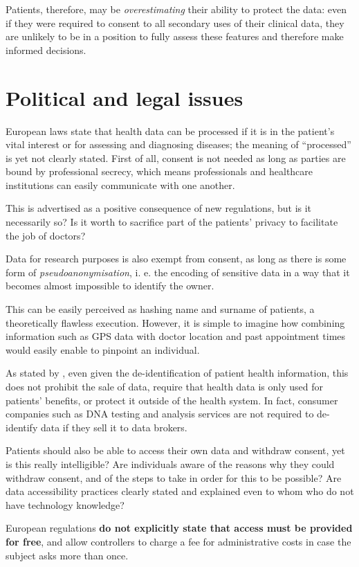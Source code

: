 \documentclass[12pt]{article}
\begin{document}
	Patients, therefore, may be \textit{overestimating} their ability to protect the data: even if they were required to consent to all secondary uses of their clinical data, they are unlikely to be in a position to fully assess these  features and therefore make informed decisions.
	
	\section{Political and legal issues}
	European laws state that health data can be processed if it is in the patient's vital interest or for assessing and diagnosing diseases; the meaning of ``processed'' is yet not clearly stated. First of all, consent is not needed as long as parties are bound by professional secrecy, which means professionals and healthcare institutions can easily communicate with one another.
	
	This is advertised as a positive consequence of new regulations, but is it necessarily so? Is it worth to sacrifice part of the patients' privacy to facilitate the job of doctors? 
	
	Data for research purposes is also exempt from consent, as long as there is some form of \textit{pseudoanonymisation}, i. e. the encoding of sensitive data in a way that it becomes almost impossible to identify the owner.
	
	This can be easily perceived as hashing name and surname of patients, a theoretically flawless execution. However, it is simple to imagine how combining information such as GPS data with doctor location and past appointment times would easily enable to pinpoint an individual.
	
	As stated by \cite{healthdata}, even given the de-identification of patient health information, this does not prohibit the sale of data, require that health data is only used for patients' benefits, or protect it outside of the health system. In fact, consumer companies such as DNA testing and analysis services are not required to de-identify data if they sell it to data brokers. 
	
	Patients should also be able to access their own data and withdraw consent, yet is this really intelligible? Are individuals aware of the reasons why they could withdraw consent, and of the steps to take in order for this to be possible? Are data accessibility practices clearly stated and explained even to whom who do not have technology knowledge?
	
	European regulations \textbf{do not explicitly state that access must be provided for free}, and allow controllers to charge a fee for administrative costs in case the subject asks more than once.
	
\end{document}
